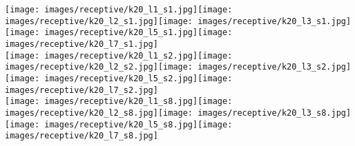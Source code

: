 \documentclass[letterpaper, 10 pt, conference]{ieeeconf}
\begin{document}
\begin{figure*}
\texttt{[image: images/receptive/k20\_l1\_s1.jpg]}\hspace{2px}\texttt{[image: images/receptive/k20\_l2\_s1.jpg]}\hspace{2px}\texttt{[image: images/receptive/k20\_l3\_s1.jpg]}\hspace{2px}\texttt{[image: images/receptive/k20\_l5\_s1.jpg]}\hspace{2px}\texttt{[image: images/receptive/k20\_l7\_s1.jpg]}\\
\vspace{2px}
\texttt{[image: images/receptive/k20\_l1\_s2.jpg]}\hspace{2px}\texttt{[image: images/receptive/k20\_l2\_s2.jpg]}\hspace{2px}\texttt{[image: images/receptive/k20\_l3\_s2.jpg]}\hspace{2px}\texttt{[image: images/receptive/k20\_l5\_s2.jpg]}\hspace{2px}\texttt{[image: images/receptive/k20\_l7\_s2.jpg]}\\
\vspace{2px}
\texttt{[image: images/receptive/k20\_l1\_s8.jpg]}\hspace{2px}\texttt{[image: images/receptive/k20\_l2\_s8.jpg]}\hspace{2px}\texttt{[image: images/receptive/k20\_l3\_s8.jpg]}\hspace{2px}\texttt{[image: images/receptive/k20\_l5\_s8.jpg]}\hspace{2px}\texttt{[image: images/receptive/k20\_l7\_s8.jpg]}\\
\vspace{2px}

\end{figure*}
\end{document}
